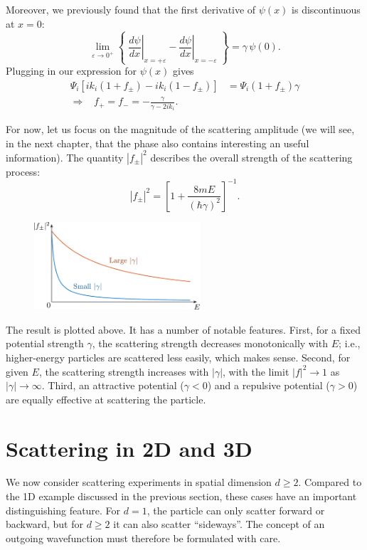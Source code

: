 \documentclass[pra,12pt]{revtex4}
\begin{document}
Moreover, we previously found that the first derivative of $\psi(x)$
is discontinuous at $x=0$:
$$\lim_{\varepsilon\rightarrow 0^+} \left\{\; \left.\frac{d\psi}{dx}\right|_{x = +\varepsilon} - \left.\frac{d\psi}{dx}\right|_{x = -\varepsilon}\; \right\}  =  \gamma\, \psi(0).$$
Plugging in our expression for $\psi(x)$ gives
$$\begin{aligned}\Psi_i\left[ik_i(1+f_\pm) - ik_i(1-f_\pm)\right]  &=  \Psi_i(1+f_\pm) \gamma \\ \Rightarrow \;\;\; f_+ = f_- = -\frac{\gamma}{\gamma - 2ik_i}.\end{aligned}$$

For now, let us focus on the magnitude of the scattering amplitude (we
will see, in the next chapter, that the phase also contains
interesting an useful information).  The quantity $|f_\pm|^2$
describes the overall strength of the scattering process:
$$|f_\pm|^2 = \left[1 + \frac{8mE}{(\hbar\gamma)^2}\right]^{-1}.$$

\begin{figure}[h]
  \centering\includegraphics[width=0.55\textwidth]{scattering1df}
\end{figure}

The result is plotted above.  It has a number of notable features.
First, for a fixed potential strength $\gamma$, the scattering
strength decreases monotonically with $E$; i.e., higher-energy
particles are scattered less easily, which makes sense.  Second, for
given $E$, the scattering strength increases with $|\gamma|$, with the
limit $|f|^2 \rightarrow 1$ as $|\gamma|\rightarrow \infty$.  Third,
an attractive potential ($\gamma < 0$) and a repulsive potential
($\gamma > 0$) are equally effective at scattering the particle.

\section{Scattering in 2D and 3D}

We now consider scattering experiments in spatial dimension $d \ge 2$.
Compared to the 1D example discussed in the previous section, these
cases have an important distinguishing feature.  For $d = 1$, the
particle can only scatter forward or backward, but for $d \ge 2$ it
can also scatter ``sideways''.  The concept of an outgoing
wavefunction must therefore be formulated with care.
\end{document}
